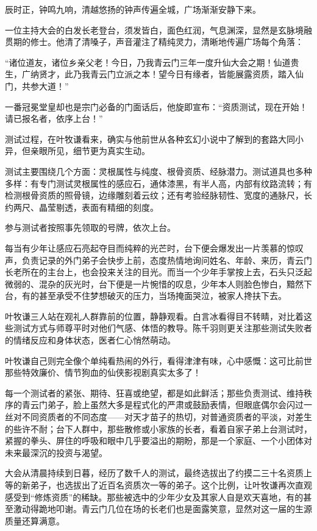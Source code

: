 辰时正，钟鸣九响，清越悠扬的钟声传遍全城，广场渐渐安静下来。

一位主持大会的白发长老登台，须发皆白，面色红润，气息渊深，显然是玄脉境融贯期的修士。他清了清嗓子，声音灌注了精纯灵力，清晰地传遍广场每个角落：

“诸位道友，诸位乡亲父老！今日，乃我青云门三年一度升仙大会之期！仙道贵生，广纳贤才，此乃我青云门立派之本！望今日有缘者，皆能展露资质，踏入仙门，共参大道！”

一番冠冕堂皇却也是宗门必备的门面话后，他旋即宣布：“资质测试，现在开始！请已报名者，依序上台！”

测试过程，在叶牧谦看来，确实与他前世从各种玄幻小说中了解到的套路大同小异，但亲眼所见，细节更为真实生动。

测试主要围绕几个方面：灵根属性与纯度、根骨资质、经脉潜力。测试道具也多种多样：有专门测试灵根属性的感应石，通体漆黑，有半人高，内部有纹路流转；有检测根骨资质的照骨镜，边缘雕刻着云纹；还有考验经脉韧性、宽度的通脉尺，长约两尺、晶莹剔透，表面有精细的刻度。

参与测试者按照事先领取的号牌，依次上台。

每当有少年让感应石亮起夺目而纯粹的光芒时，台下便会爆发出一片羡慕的惊叹声，负责记录的外门弟子会快步上前，态度热情地询问姓名、年龄、来历，青云门长老所在的主台上，也会投来关注的目光。而当一个少年手掌按上去，石头只泛起微弱的、混杂的灰光时，台下便是一片惋惜的叹息，少年本人则脸色惨白，黯然下台，有的甚至承受不住梦想破灭的压力，当场掩面哭泣，被家人搀扶下去。

叶牧谦三人站在观礼人群靠前的位置，静静观看。白言冰看得目不转睛，对比着这些测试方式与师尊平时对他们气感、体悟的教导。陈千羽则更关注那些测试失败者的情绪反应和身体状态，医者仁心悄然萌动。

叶牧谦自己则完全像个单纯看热闹的外行，看得津津有味，心中感慨：这可比前世那些特效廉价、情节狗血的仙侠影视剧真实太多了！

每一个测试者的紧张、期待、狂喜或绝望，都是如此鲜活；那些负责测试、维持秩序的青云门弟子，脸上虽然大多是程式化的严肃或鼓励表情，但眼底偶尔会闪过一丝对不同资质者的不同态度——对天才苗子的热切，对普通资质者的平淡，对差生的些许不耐；台下人群中，那些散修或小家族的长者，看着自家子弟上台测试时，紧握的拳头、屏住的呼吸和眼中几乎要溢出的期盼，那是一个家庭、一个小团体对未来最深沉的投资与渴望。

大会从清晨持续到日暮，经历了数千人的测试，最终选拔出了约摸二三十名资质上等的新弟子，也选拔出了近百名资质次一等的弟子。这个比例，让叶牧谦再次直观感受到“修炼资质”的稀缺。那些被选中的少年少女及其家人自是欢天喜地，有的甚至激动得跪地叩谢。青云门几位在场的长老们也是面露笑意，显然对这一届的生源质量还算满意。

